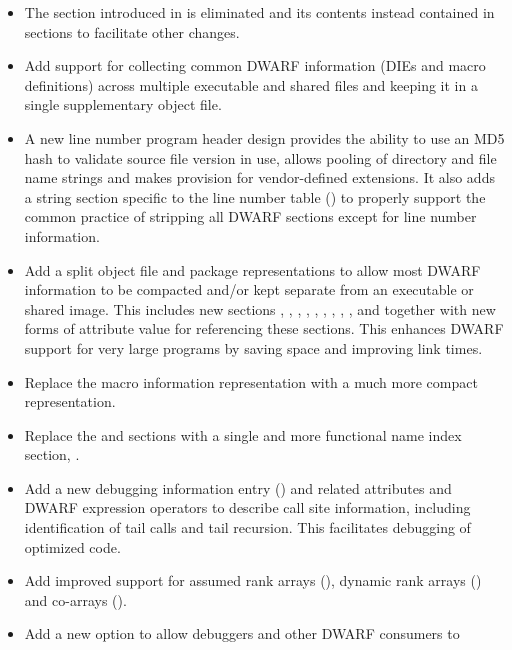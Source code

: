 \begin{itemize}
\item The \dotdebugtypes{}
section introduced in \DWARFVersionIV{} 
is eliminated and its contents instead contained in \dotdebuginfo{} sections
to facilitate other changes.
\item Add support for collecting common DWARF information (DIEs and macro definitions)
across multiple executable and shared files and keeping it in a single
supplementary object file.
\item A new line number program header design provides the ability to 
use an MD5 hash to validate source file version in use, allows pooling 
of directory and file name strings and makes provision for vendor-defined
extensions. It also adds a string section specific to the line number table 
(\dotdebuglinestr)
to properly support the common practice of stripping all DWARF sections
except for line number information.
\item Add a split object file and package representations to allow most 
DWARF information to be compacted and/or kept separate from an executable 
or shared image. This includes new sections 
\dotdebugaddr, \dotdebugstroffsets, \dotdebugabbrevdwo, \dotdebuginfodwo, 
\dotdebuglinedwo, \dotdebuglocdwo, \dotdebugmacrodwo, \dotdebugstrdwo,
\dotdebugstroffsetsdwo, \dotdebugcuindex{} and \dotdebugtuindex{} 
together with new forms of attribute value for referencing these sections.
This enhances DWARF support for very large programs by saving space 
and improving link times.
\item Replace the \dotdebugmacinfo{} macro information representation with
a much more compact \dotdebugmacro{} representation.
\item Replace the \dotdebugpubnames{} and \dotdebugtypes{} sections
with a single and more functional name index section, \dotdebugnames{}.
\item Add a new debugging information entry (\DWTAGcallsiteNAME) and related 
attributes and DWARF expression operators to describe call site information, 
including identification of tail calls and tail recursion.
This facilitates debugging of optimized code.
\item Add improved support for  assumed rank arrays 
(\DWTAGgenericsubrangeNAME), dynamic rank arrays (\DWATrankNAME)
and co-arrays (\DWTAGcoarraytypeNAME{}).
\item Add a new option to allow debuggers and other DWARF consumers to

\end{itemize}
